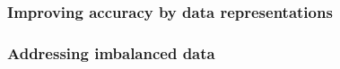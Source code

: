 \subsubsection{Improving accuracy by data representations}

\subsubsection{Addressing imbalanced data}

